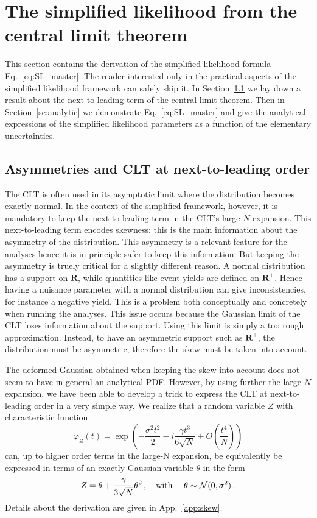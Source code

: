 \documentclass[11pt]{article}
\newcommand{\be}{\begin{equation}}
\newcommand{\ee}{\end{equation}}
\begin{document}
\section{The simplified likelihood from the central limit theorem}
\label{se:SL_theory}

This section contains the derivation of the simplified likelihood formula Eq.~\eqref{eq:SL_master}.
The reader interested only in the practical aspects of the simplified likelihood framework can safely skip it. In Section~\ref{se:skew_CLT} we lay down a  result about the next-to-leading term of the central-limit theorem. Then in Section~\ref{se:analytic} we demonstrate Eq.~\eqref{eq:SL_master} and give the analytical expressions of the simplified likelihood parameters as a function of the elementary uncertainties.

\subsection{Asymmetries and CLT at next-to-leading order}
\label{se:skew_CLT}

The CLT is often used in its asymptotic limit where the distribution becomes exactly normal. In the context of the simplified framework, however, it is mandatory to keep the next-to-leading  term in the CLT's large-$N$ expansion. This next-to-leading term encodes skewness: this is the main information about the asymmetry of the distribution. This asymmetry is a relevant feature for the analyses hence it is in principle safer to keep this information. But keeping the asymmetry is truely critical for a slightly different reason. A normal distribution has a support on $\mathbf{R}$, while quantities like event yields are defined on $\mathbf{R}^+$. Hence having a nuisance parameter with a normal distribution can give inconsistencies, for instance a negative yield. This is a problem both conceptually and concretely when running the  analyses. This issue occurs because the  Gaussian limit of the CLT  loses information about the support. Using this limit is simply a too rough approximation.
  Instead, to have an asymmetric support such as $\mathbf{R}^+$,  the distribution must be asymmetric, therefore the skew must be taken into account.


The deformed Gaussian obtained when keeping the skew into account does not seem to have in general an analytical PDF. However, by using further the large-$N$  expansion, we have been able to develop a  trick to express the CLT at next-to-leading order in a very simple way. We realize that a random variable $Z$ with characteristic function
\be
\varphi_Z(t)=\exp\left(-\frac{\sigma^2 t^2}{2}-i \frac{\gamma t^3}{6 \sqrt{N}} +O\left(\frac{t^4}{N}\right)\right) \label{eq:CF_CLT}
 \ee
can, up to higher order terms in the large-N expansion, be equivalently be expressed in terms of an exactly Gaussian variable $\theta$ in the form
\be
Z= \theta+\frac{\gamma}{3\sqrt{N}}\theta^2\,,  \quad \textrm{with } \quad \theta\sim{\cal N}(0,\sigma^2)\,. \label{eq:ZskewCLT}
\ee
Details about the derivation are given in App.~\ref{app:skew}.
\end{document}
